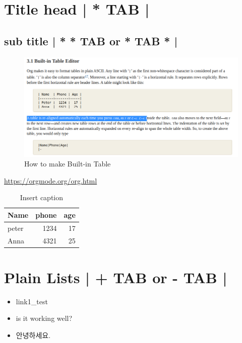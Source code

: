 \documentclass[11pt]{article}
\author{JJ Kim}
\date{\today}
\title{}
\begin{document}
\tableofcontents

\section{Title head  | *  TAB |}
\label{sec:orgf648466}
\subsection{sub title | * * TAB or * TAB * |}
\label{sec:orgb8c8a3c}
\begin{figure}[htbp]
\centering
\includegraphics[width=.9\linewidth]{./img/samples/samples1.png}
\caption{\label{fig:a-1}How to make Built-in Table}
\end{figure}
\url{https://orgmode.org/org.html}

\begin{table}[htbp]
\caption{\label{table: 1}Insert caption}
\centering
\begin{tabular}{lrr}
Name & phone & age\\
\hline
peter & 1234 & 17\\
Anna & 4321 & 25\\
\end{tabular}
\end{table}



\section{Plain Lists | + TAB or - TAB |}
\label{sec:org17c7fbc}
\begin{itemize}
\item link1\_test
\item is it working well?
\item 안녕하세요.
\end{itemize}
\end{document}
